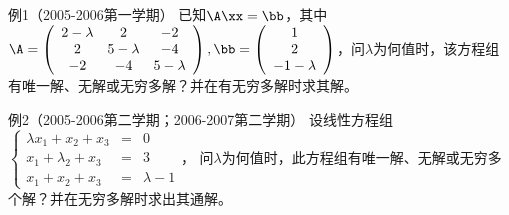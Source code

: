 \begin{frame}\ft{\subsecname}
  \begin{scriptsize}
    \begin{exampleblock}{例1（2005-2006第一学期）}
      已知$\A\xx=\bb$，其中$\A=\left(
      \begin{array}{ccc}
        2-\lambda & 2 & -2\\
        2 & 5-\lambda & -4\\
        -2 & -4 & 5-\lambda
      \end{array}
      \right), \bb=\left(
      \begin{array}{c}
        1\\2\\-1-\lambda
      \end{array}
      \right)$，问$\lambda$为何值时，该方程组有唯一解、无解或无穷多解？并在有无穷多解时求其解。
    \end{exampleblock}

    \begin{exampleblock}{例2（2005-2006第二学期；2006-2007第二学期）}
      设线性方程组$\left\{
      \begin{array}{rcl}
        \lambda x_1+x_2+x_3&=&0\\
        x_1+\lambda_2+x_3&=&3\\
        x_1+x_2+x_3&=&\lambda-1
      \end{array}
      \right.$，
      问$\lambda$为何值时，此方程组有唯一解、无解或无穷多个解？并在无穷多解时求出其通解。
    \end{exampleblock}
  \end{scriptsize}
\end{frame}



